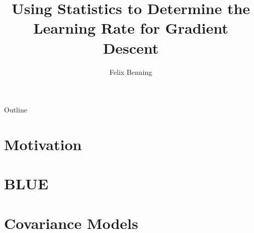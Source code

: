 \documentclass[
	hyperref={unicode, colorlinks=true, linkcolor=.}
]{beamer}
\title{Using Statistics to Determine the Learning Rate for Gradient Descent}
\author{Felix Benning}
\institute{University of Mannheim}
\begin{document}
	\frame{\titlepage}

	\begin{frame}{Outline}
		\tableofcontents
	\end{frame}


	\section{Motivation}

	
	
	

	\section{BLUE}

	\section{Covariance Models}



\printbibliography[heading=bibintoc]	
\end{document}
